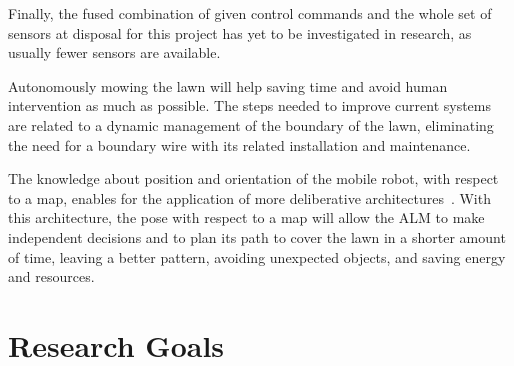 Finally, the fused combination of given control commands and the whole set of sensors at disposal for this project has yet to be investigated in research, as usually fewer sensors are available.




Autonomously mowing the lawn will help saving time and avoid human intervention as much as possible.
The steps needed to improve current systems are related to a dynamic management of the boundary of the lawn, eliminating the need for a boundary wire with its related installation and maintenance.

The knowledge about position and orientation of the mobile robot, with respect to a map, enables for the application of more deliberative architectures~\cite{genesereth_logical_1987}.
With this architecture, the pose with respect to a map will allow the \gls{ALM} to make independent decisions and to plan its path to cover the lawn in a shorter amount of time, leaving a better pattern, avoiding unexpected objects, and saving energy and resources.


\section{Research Goals}

